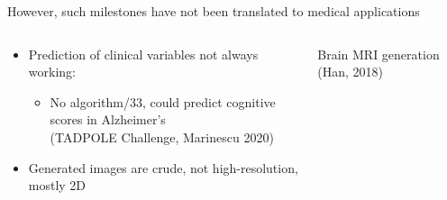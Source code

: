 \documentclass[8pt,xcolor=table,aspectratio=169]{beamer}
\begin{document}
\begin{frame}{However, such milestones have not been translated to medical applications}

\begin{columns}[t]
\begin{column}{0.5\textwidth}
\centering

\begin{itemize}
\item Prediction of clinical variables not always working: 
\begin{itemize}
\item No algorithm/33, could predict cognitive scores in Alzheimer's\\ (TADPOLE Challenge, Marinescu 2020)
\end{itemize}
\vspace{4em}

\item Generated images are crude, not high-resolution, mostly 2D

\vspace{4em}



\end{itemize}


\end{column}
\begin{column}{0.5\textwidth}
\centering
Brain MRI generation (Han, 2018)
\begin{figure}

\vo




\end{figure}
\end{column}
\end{columns}

 
 
\end{frame}


\end{document}
